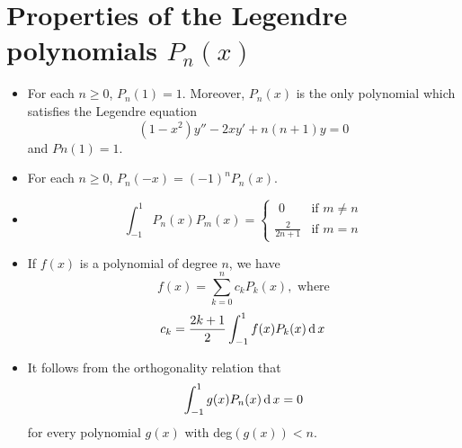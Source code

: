 \documentclass[../main-sheet.tex]{subfiles}
\begin{document}
\section{Properties of the Legendre polynomials $ P_n(x) $}
\begin{itemize}
    \item For each $ n\geq 0 $, $ P_n(1) = 1 $. Moreover, $ P_n(x ) $ is the only polynomial which satisfies the Legendre equation
        \[
            \left(1 - x^2\right)y'' - 2xy' + n(n + 1)y = 0
        \]
    and $  Pn(1) = 1 $.
    \item For each $ n \geq 0 $, $ P_n(-x ) = (-1)^n P_n(x ) $.
    \item 
        \[
            \int_{-1}^1 P_n(x)P_m(x)=
            \begin{cases}
                \,\,0&\text{if }m\neq n\\
                \frac{2}{2n+1}&\text{if }m=n
            \end{cases}
        \]
    \item If $ f (x ) $ is a polynomial of degree $ n $, we have
        \[
            f (x ) =\sum_{k=0}^n c_k P_k (x ), \text{ where}
        \]
        \[
            c_k=\frac{2k + 1}{2}\int_{-1}^1 f(x)P_k(x)\,\mathrm{d}\, x
        \]
    \item It follows from the orthogonality relation that
        \[
            \int_{-1}^1 g(x)P_n(x)\,\mathrm{d}\, x=0
        \]
        for every polynomial $ g (x ) $ with deg$ (g (x )) < n $.
\end{itemize}
\end{document}
